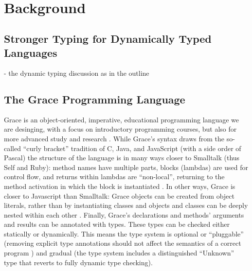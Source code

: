 
\section{Background}
\label{sec:background}

\subsection{Stronger Typing for Dynamically Typed Languages}


\begin{cnote}
- the dynamic typing discussion as in the outline
\end{cnote}

\subsection{The Grace Programming Language}

Grace is an object-oriented, imperative, educational programming
language we are desinging, with a focus on introductory programming
courses, but also for more advanced study and research
\cite{graceAbsence,seekinGraceSIGCSE}.  While Grace's syntax draws
from the so-called ``curly bracket'' tradition of C, Java, and
JavaScript (with a side order of Pascal) the structure of the language
is in many ways closer to Smalltalk (thus Self and Ruby): method names
have multiple parts, blocks (lambdas) are used for control flow, and
returns within lambdas are ``non-local'', returning to the method
activation in which the block is instantiated \cite{bluebook}.  In
other ways, Grace is closer to Javascript than Smalltalk: Grace
objects can be created from object literals, rather than by
instantiating classes \cite{Black2007-emeraldHOPL,JonesECOOP2016} and
objects and classes can be deeply nested within each other
\cite{betabook}.  Finally, Grace's declarations and methods' arguments
and results can be annotated with types.  These types can be checked
either statically or dynamically. This means the type system is
optional or ``pluggable'' \cite{GiladPliggable2004} (removing explicit
type annotations should not affect the semantics of a correct program
\cite{gradualGuaratee}) and gradual (the type system includes a
distinguished ``Unknown'' type that reverts to fully
dynamic type checking).

